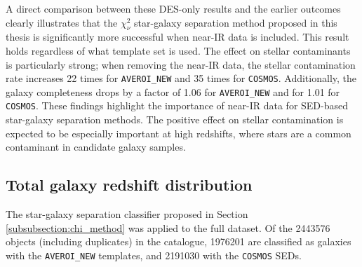 A direct comparison between these DES-only results and the earlier \DESVIDEO outcomes clearly illustrates that the $\chi_{\nu}^2$ star-galaxy separation method proposed in this thesis is significantly more successful when near-IR data is included. This result holds regardless of what template set is used. The effect on stellar contaminants is particularly strong; when removing the near-IR data, the stellar contamination rate increases 22 times for \texttt{AVEROI\_NEW} and 35 times for \texttt{COSMOS}. Additionally, the galaxy completeness drops by a factor of 1.06 for \texttt{AVEROI\_NEW} and for 1.01 for \texttt{COSMOS}. These findings highlight the importance of near-IR data for SED-based star-galaxy separation methods.  The positive effect on stellar contamination is expected to be especially important at high redshifts, where stars are a common contaminant in candidate galaxy samples. \par 



\subsection{Total galaxy redshift distribution}
The star-galaxy separation classifier proposed in Section \ref{subsubsection:chi_method} was applied to the full \DESVIDEO dataset. Of the \num{2443576} objects (including duplicates) in the catalogue, \num{1 976 201} are classified as galaxies with the \texttt{AVEROI\_NEW} templates, and \num{2 191 030} with the \texttt{COSMOS} SEDs. \par



